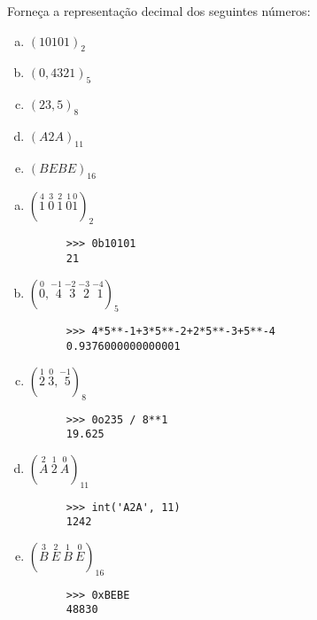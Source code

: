 \begin{exeresol}
  Forneça a representação decimal dos seguintes números:
  \begin{enumerate}[a)]
  \item $(10101)_2$
  \item $(0,4321)_5$
  \item $(23,5)_8$
  \item $(A2A)_{11}$
  \item $(BEBE)_{16}$
  \end{enumerate}
\end{exeresol}
\begin{resol}
  \begin{enumerate}[a)]
  \item $(\stackrel{4}{1}~\stackrel{3}{0}~\stackrel{2}{1}~\stackrel{1}{0}\stackrel{0}{1})_2$

    \begin{lstlisting}
      >>> 0b10101
      21
    \end{lstlisting}

  \item $(\stackrel{0}{0},\stackrel{-1}{~\,4}~\stackrel{-2}{~\,3}~\stackrel{-3}{~\,2}~\stackrel{-4}{~\,1})_5$

    \begin{lstlisting}
      >>> 4*5**-1+3*5**-2+2*5**-3+5**-4
      0.9376000000000001
    \end{lstlisting}
  
  \item $(\stackrel{1}{2}~\stackrel{0}{3},\stackrel{-1}{~\,5})_8$

    \begin{lstlisting}
      >>> 0o235 / 8**1
      19.625
    \end{lstlisting}

  \item $(\stackrel{2}{A}~\stackrel{1}{2}~\stackrel{0}{A})_{11}$

    \begin{lstlisting}
      >>> int('A2A', 11)
      1242
    \end{lstlisting}

  \item $(\stackrel{3}{B}~\stackrel{2}{E}~\stackrel{1}{B}~\stackrel{0}{E})_{16}$

    \begin{lstlisting}
      >>> 0xBEBE
      48830
    \end{lstlisting}
  \end{enumerate}
\end{resol}

